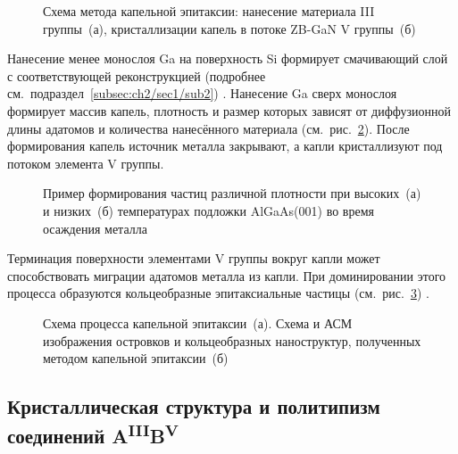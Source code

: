 \begin{figure}[ht]  \caption{Схема
		метода капельной эпитаксии: нанесение материала III группы~(а),
		кристаллизации капель в потоке ZB-GaN V группы~(б)
		\cite{Gurioli2019}}\label{fig:Image_8_1} \end{figure}

Нанесение менее монослоя Ga на поверхность Si формирует смачивающий слой с
соответствующей реконструкцией (подробнее
см.~подраздел~\cref{subsec:ch2/sec1/sub2}) \cite{Park1988}. Нанесение Ga сверх
монослоя формирует массив капель, плотность и размер которых зависят от
диффузионной длины адатомов и количества нанесённого материала
(см.~рис.~\cref{fig:Image_8_2}). После формирования капель источник металла
закрывают, а капли кристаллизуют под потоком элемента V группы.

\begin{figure}[ht]  \caption{Пример
		формирования частиц различной плотности при высоких~(а) и низких~(б)
		температурах подложки AlGaAs(001) во время осаждения металла
		\cite{Gurioli2019}}\label{fig:Image_8_2} \end{figure}

Терминация поверхности элементами V группы вокруг капли может способствовать
миграции адатомов металла из капли. При доминировании этого процесса образуются
кольцеобразные эпитаксиальные частицы (см.~рис.~\cref{fig:Image_8_3})
\cite{Gurioli2019, mano2005}.

\begin{figure}[ht]  \caption{Схема
		процесса капельной эпитаксии~(а). Схема и АСМ изображения островков и
		кольцеобразных наноструктур, полученных методом капельной эпитаксии~(б)
		\cite{Gurioli2019}}\label{fig:Image_8_3} \end{figure}

\subsection{Кристаллическая структура и политипизм соединений
A\textsuperscript{III}B\textsuperscript{V}}\label{subsec:ch1/sec2/sub3}

